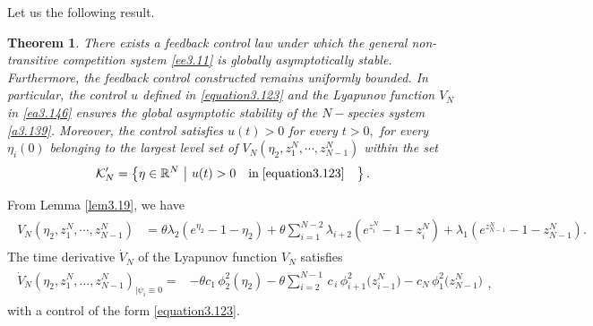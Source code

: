 \documentclass[10pt, a4paper]{amsart}
\makeatletter
\theoremstyle{plain}
\newtheorem{theorem}[lemma]{Theorem}
\theoremstyle{definition}
\theoremstyle{remark}
\renewenvironment{proof}[1][\proofname]{\par
  \pushQED{\qed}%
  \normalfont \topsep6\p@\@plus6\p@\relax
  \trivlist
  \item[\hskip\labelsep
        \itshape
    #1\ \ref{#1}.]\ignorespaces
}{%
  \popQED\endtrivlist\@endpefalse
}
\numberwithin{equation}{section}
\makeatother
\begin{document}
Let us the following result.
\begin{theorem}\label{theorem3.20}
There exists a feedback control law under which the general non-transitive competition system \eqref{ee3.11} is globally asymptotically stable. Furthermore, the feedback control constructed remains uniformly bounded. In particular, the control $u$ defined in \eqref{equation3.123} and the Lyapunov function $V_{N}$ in \eqref{ea3.146} ensures the global asymptotic stability of the $N-$species system \eqref{a3.139}. Moreover, the control satisfies $u(t)>0$ for every $t>0,$ for every $\eta_i(0)$ belonging to the largest
level set of $V_{N}(\eta_2, z^N_1, \cdots, z^N_{N-1})$ within the set 
\begin{align}
\mathcal{K}'_{N}= 
\left\{ \eta\in\mathbb{R}^{N}\ \middle|\ 
\begin{aligned}
&u(t)>0\quad\text{in}\;\eqref{equation3.123}
\end{aligned}
\right\}.
\end{align}
\end{theorem}
\begin{proof}[of Theorem \ref{theorem3.20}]
From Lemma \ref{lem3.19}, we have 
\begin{align}
\begin{aligned}
V_N(\eta_2,z^N_1,\cdots,z^N_{N-1})&= \theta \lambda_2(e^{\eta_{2}}-1-\eta_{2})+\theta \sum_{i=1}^{N-2}\lambda_{i+2}(e^{z^N_{i}}-1-z^N_{i})+\lambda_1(e^{z^N_{N-1}}-1-z^N_{N-1}).
\end{aligned}
\end{align}
The time derivative $\dot V_{N}$ of the Lyapunov function $V_{N}$ satisfies
\begin{align}%
\begin{aligned}
\dot V_N(\eta_2, z^N_1,\dots,z^N_{N-1})_{\mid \psi_i\equiv 0}
={}&
-\theta c_1\,\phi_2^2(\eta_2)
-\theta\sum_{i=2}^{N-1}\,c_{\,i}\,\phi_{i+1}^2\bigl(z^N_{i-1}\bigr)
- c_{N}\,\phi_1^2\bigl(z^N_{N-1}\bigr) 
\end{aligned},
\end{align}
with a control of the form \eqref{equation3.123}.
\end{proof}
\end{document}
